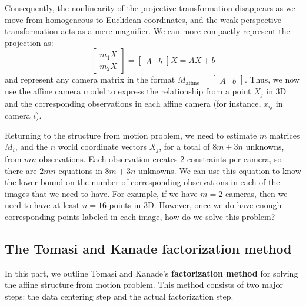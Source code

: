 \documentclass[a4paper, 12pt]{article}
\renewcommand\emph{\textbf}
\numberwithin{equation}{section}
\begin{document}
Consequently, the nonlinearity of the projective transformation disappears as we move from homogeneous to Euclidean coordinates, and the weak perspective transformation acts as a mere magnifier. We can more compactly represent the projection as:
\begin{equation}
    \begin{bmatrix} m_1X \\ m_2X \end{bmatrix} = \begin{bmatrix}A & b \end{bmatrix} X = AX + b
\end{equation}
and represent any camera matrix in the format $M_\mathrm{affine} = \begin{bmatrix}A &b \end{bmatrix}$. Thus, we now use the affine camera model to express the relationship from a point $X_j$  in 3D and the corresponding observations in each affine camera (for instance, $x_{ij}$ in camera $i$).

Returning to the structure from motion problem, we need to estimate $m$ matrices $M_i$, and the $n$ world coordinate vectors $X_j$, for a total of $8m+3n$ unknowns, from $mn$ observations. Each observation creates 2 constraints per camera, so there are $2mn$ equations in $8m+3n$ unknowns. We can use this equation to know the lower bound on the number of corresponding observations in each of the images that we need to have. For example, if we have $m=2$ cameras, then we need to have at least $n=16$ points in 3D. However, once we do have enough corresponding points labeled in each image, how do we solve this problem?  

\subsection{The Tomasi and Kanade factorization method} 
In this part, we outline Tomasi and Kanade’s \emph{factorization method} for solving the affine structure from motion problem. This method consists of two major steps: the data centering step and the actual factorization step. 
\end{document}
